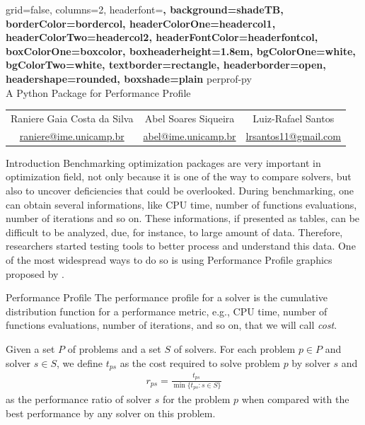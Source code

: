 \documentclass[a0paper,portrait]{baposter}
\begin{document}
\begin{poster}
  {
    grid=false,
    columns=2,
    headerfont=\Large\sf\bf,
    background=shadeTB,
    borderColor=bordercol,
    headerColorOne=headercol1,
    headerColorTwo=headercol2,
    headerFontColor=headerfontcol,
    boxColorOne=boxcolor,
    boxheaderheight=1.8em,
    bgColorOne=white,
    bgColorTwo=white,
    textborder=rectangle,
    headerborder=open,
    headershape=rounded,
    boxshade=plain
  }
  {
    \unicamplogol
  }
  {
    perprof-py \\ A Python Package for Performance Profile
  }
  {
    \begin{tabular}{ccc}
      Raniere Gaia Costa da Silva &
      Abel Soares Siqueira &
      Luiz-Rafael Santos \\
      \url{raniere@ime.unicamp.br} &
      \url{abel@ime.unicamp.br} &
      \url{lrsantos11@gmail.com}
    \end{tabular}
  }
  {
    \imecclogo
  }

  \begin{posterbox}[column=0]{Introduction}
    Benchmarking optimization packages are very important in optimization
    field, not only because it is one of the way to compare solvers, but also
    to uncover deficiencies that could be overlooked. During benchmarking, one
    can obtain several informations, like CPU time, number of functions
    evaluations, number of iterations and so on. These informations, if
    presented as tables, can be difficult to be analyzed, due, for instance,
    to large amount of data. Therefore, researchers started testing tools to
    better process and understand this data.  One of the most widespread ways
    to do so is using Performance Profile graphics proposed by
    \textcite{Dolan2001}.
  \end{posterbox}

  \begin{posterbox}[column=0,below=auto]{Performance Profile}
    The performance profile for a solver is the cumulative distribution
    function for a performance metric, e.g., CPU time, number of functions
    evaluations, number of iterations, and so on, that we will call \emph{cost}.

    Given a set $P$ of problems and a set $S$ of solvers. For each problem $p
    \in P$ and solver $s \in S$, we define $t_{ps}$ as the cost
    required to solve problem $p$ by solver $s$ and
    \begin{align*}
      r_{ps} = \frac{t_{ps}}{\min\{t_{ps}: s \in S\}}
    \end{align*}
    as the performance ratio of solver $s$ for the problem $p$ when compared
    with the best performance by any solver on this problem.


\end{posterbox}
\end{poster}
\end{document}
